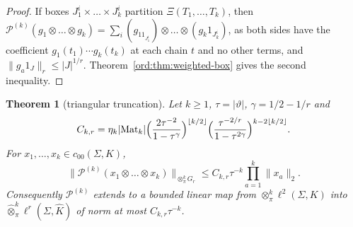\documentclass[11pt]{amsart}
\newtheorem{theorem}{Theorem}[section]
\theoremstyle{definition}
\theoremstyle{remark}
\numberwithin{equation}{section}
\newcommand{\abs}[1]{\lvert #1\rvert}
\newcommand{\norm}[1]{\lVert #1\rVert}
\newcommand{\Kh}{\widehat K}
\theoremstyle{plain}
\theoremstyle{definition}
\theoremstyle{plain}
\newcommand{\cP}{\mathcal P}
\begin{document}
\begin{proof}
If boxes $J^i_1\times\dots\times J^i_k$ partition $\Xi(T_1,\dots,T_k)$, then
$\cP^{(k)}(g_1\otimes\dots\otimes g_k)=\sum_i(g_11_{J^i_1})\otimes\dots\otimes(g_k1_{J^i_k})$, as both sides have the
coefficient $g_1(t_1)\cdots g_k(t_k)$ at each chain $t$ and no other terms, and $\norm{g_a1_J}_r\le\abs J^{1/r}$.
Theorem~\ref{ord:thm:weighted-box} gives the second inequality.
\end{proof}

\begin{theorem}[triangular truncation]\label{ord:thm:triangle}
Let $k\ge1$, $\tau=\abs\vartheta$, $\gamma=1/2-1/r$ and
\[
 C_{k,r}=\eta_k\abs{\operatorname{Mat}_k}\Bigl(\frac{2\tau^{-2}}{1-\tau^\gamma}\Bigr)^{\lfloor k/2\rfloor}
 \Bigl(\frac{\tau^{-2/r}}{1-\tau^{2\gamma}}\Bigr)^{k-2\lfloor k/2\rfloor}.
\]
For $x_1,\dots,x_k\in c_{00}(\Sigma,K)$,
\begin{equation}\label{ord:eq:triangle}
 \norm{\cP^{(k)}(x_1\otimes\dots\otimes x_k)}_{\otimes^k_\pi G_r}\le C_{k,r}\tau^{-k}\prod_{a=1}^k\norm{x_a}_2 .
\end{equation}
Consequently $\cP^{(k)}$ extends to a bounded linear map from $\otimes^k_\pi\ell^2(\Sigma,K)$ into
$\widehat\otimes^k_\pi\ell^r(\Sigma,\Kh)$ of norm at most $C_{k,r}\tau^{-k}$.
\end{theorem}
\end{document}

